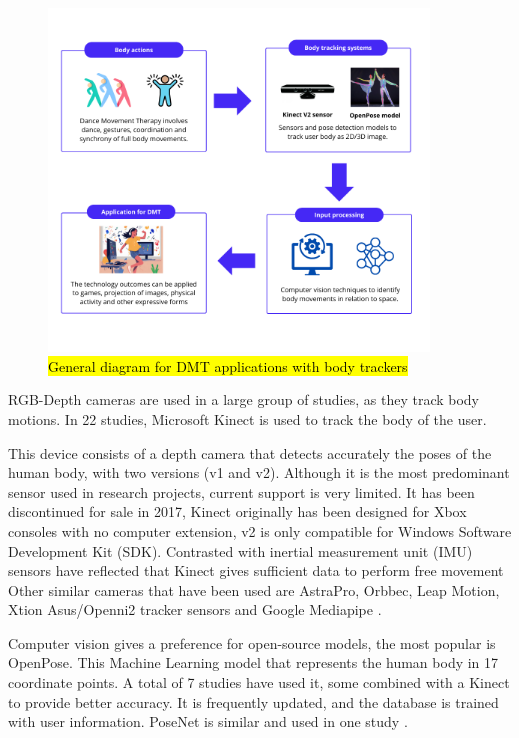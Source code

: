 \documentclass[a4paper,fleqn]{cas-sc}
\begin{document}
\begin{figure}
	\includegraphics[width=0.9\textwidth]{fig-general-dmt-flow.png}
        \centering
	  \caption{\hl{General diagram for DMT applications with body trackers}}\label{fig:general-dmt-app}
\end{figure}

RGB-Depth cameras are used in a large group of studies, as they track body motions. In 22 studies, Microsoft Kinect is used to track the body of the user. 

This device consists of a depth camera that detects accurately the poses of the human body, with two versions (v1 and v2). Although it is the most predominant sensor used in research projects, current support is very limited. It has been discontinued for sale in 2017, Kinect originally has been designed for Xbox consoles with no computer extension, v2 is only compatible for Windows Software Development Kit (SDK). Contrasted with inertial measurement unit (IMU) sensors have reflected that Kinect gives sufficient data to perform free movement \cite{Geminiani19} 
Other similar cameras that have been used are AstraPro, Orbbec, Leap Motion, Xtion Asus/Openni2 \cite{Chevalier17} tracker sensors and Google Mediapipe \cite{DeCarolis21}.

Computer vision gives a preference for open-source models, the most popular is OpenPose. This Machine Learning model that represents the human body in 17 coordinate points. A total of 7 studies have used it, some combined with a Kinect to provide better accuracy. It is frequently updated, and the database is trained with user information. PoseNet is similar and used in one study \cite{Pohl20}.
\end{document}
